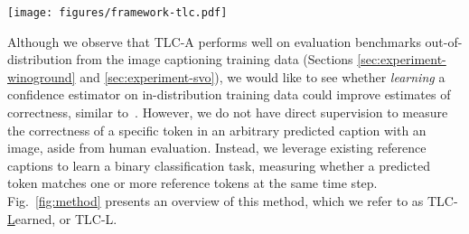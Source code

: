 \documentclass[10pt,twocolumn,letterpaper]{article}
\newcommand{\figref}[1]{Fig.\xspace~\ref{#1}}
\newcommand{\ApproachName}{TLC\xspace}
\begin{document}
\begin{figure*}
  \centering
     \texttt{[image: figures/framework-tlc.pdf]}
  \caption{\ApproachName-L: A framework to learn token-level confidence for a pretrained autoregressive encoder-decoder captioning model. We first use the captioning model to predict the next token (\eg, ``standing'') after a partial reference caption (\eg, ``a dog''), shown in the bottom left. We input this sequence along with the image and the rest of the reference caption to the model, and obtain corresponding encoder and decoder features. These features become the inputs to our confidence estimator, a Transformer encoder. For supervising correctness, we create a binary classification task to learn whether or not the model's predicted token matched any reference token at the same time step with the same prefix.
  }
  \label{fig:method}
\end{figure*} 
Although we observe that \ApproachName-A performs well on evaluation benchmarks out-of-distribution from the image captioning training data (Sections \ref{sec:experiment-winoground} and \ref{sec:experiment-svo}), we would like to see whether \textit{learning} a confidence estimator on in-distribution training data could improve estimates of correctness, similar to~\cite{whitehead2022reliable}.
However, we do not have direct supervision to measure the correctness of a specific token in an arbitrary predicted caption with an image, aside from human evaluation. Instead, we leverage existing reference captions to learn a binary classification task, measuring whether a predicted token matches one or more reference tokens at the same time step. \figref{fig:method} presents an overview of this method, which we refer to as \ApproachName-\underline{L}earned, or \ApproachName-L.
\end{document}
